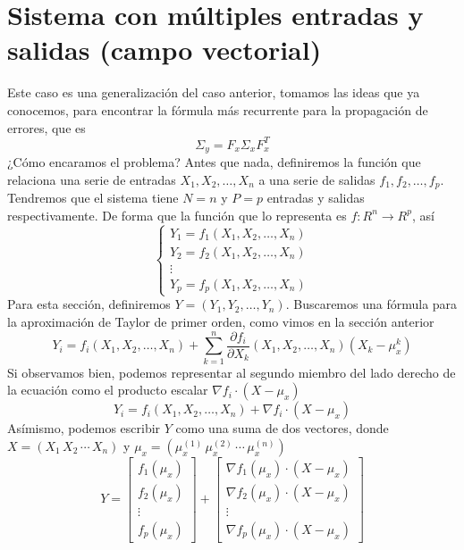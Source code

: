 \documentclass[a4paper, 10pt]{article}
\begin{document}
\section{Sistema con múltiples entradas y salidas (campo vectorial)}
Este caso es una generalización del caso anterior, tomamos las ideas que ya conocemos, para encontrar la fórmula
más recurrente para la propagación de errores, que es
\begin{equation}
    \Sigma_y = F_x \Sigma_x F_x^{T}
\end{equation}
¿Cómo encaramos el problema? Antes que nada, definiremos la función que relaciona una serie de entradas $X_1,X_2,\dots,X_n$ a una serie de salidas $f_1,f_2,\dots,f_p$.
Tendremos que el sistema tiene $N=n$ y $P=p$ entradas y salidas respectivamente. De forma que la función que lo representa es $f:R^{n} \to R^{p}$, así
\begin{equation}
    \begin{cases}
        Y_1 = f_1(X_1,X_2,\dots,X_n) \\
        Y_2 = f_2(X_1,X_2,\dots,X_n) \\
        \vdots                       \\
        Y_p = f_p(X_1,X_2,\dots,X_n)
    \end{cases}
\end{equation}
Para esta sección, definiremos $Y=\left(Y_1,Y_2,\dots,Y_n\right)$.
Buscaremos una fórmula para la aproximación de Taylor de primer orden, como vimos en la sección anterior
\begin{equation}
    Y_i = f_i(X_1,X_2,\dots,X_n) + \sum_{k=1}^{n}{\dfrac{\partial f_i}{\partial X_k}
    \left(X_1,X_2,\dots,X_n\right)\left(X_k - \mu_{x}^{k}\right)}
\end{equation}
Si observamos bien, podemos representar al segundo miembro del lado derecho de la ecuación como
el producto escalar $\nabla f_i \cdot (X-\mu_x)$
\begin{equation}
    Y_i = f_i(X_1,X_2,\dots,X_n) + \nabla f_i \cdot (X-\mu_x)
\end{equation}
Asímismo, podemos escribir $Y$ como una suma de dos vectores, donde $X=\left(X_1\, X_2\, \cdots\, X_n\right)$ y
$\mu_x = \left(\mu_x^{(1)}\,\mu_x^{(2)}\,\cdots\, \mu_x^{(n)}\right)$
\begin{equation}
    Y = \begin{bmatrix}
        f_1(\mu_x) \\
        f_2(\mu_x) \\
        \vdots     \\
        f_p(\mu_x)
    \end{bmatrix} +
    \begin{bmatrix}
        \nabla f_1\left(\mu_x\right) \cdot (X-\mu_x) \\
        \nabla f_2\left(\mu_x\right) \cdot (X-\mu_x) \\
        \vdots                                       \\
        \nabla f_p\left(\mu_x\right) \cdot (X-\mu_x)
    \end{bmatrix}
\end{equation}
\end{document}
